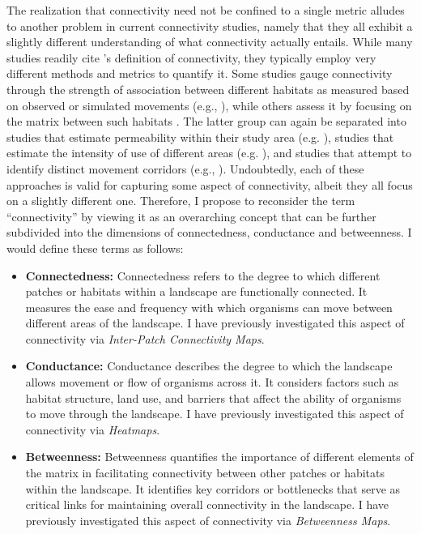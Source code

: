 \documentclass[../FinalThesis.tex]{subfiles}
\begin{document}
The realization that connectivity need not be confined to a single metric
alludes to another problem in current connectivity studies, namely that they all
exhibit a slightly different understanding of what connectivity actually
entails. While many studies readily cite \citet{Taylor.1993}'s definition of
connectivity, they typically employ very different methods and metrics to
quantify it. Some studies gauge connectivity through the strength of association
between different habitats as measured based on observed or simulated movements
(e.g., \citealp{Revilla.2008, Kanagaraj.2013, Dilts.2016}), while others assess
it by focusing on the matrix between such habitats \citep{Etherington.2016,
Diniz.2019}. The latter group can again be separated into studies that estimate
permeability within their study area (e.g. \citealp{Martin.2018}), studies that
estimate the intensity of use of different areas (e.g. \citealp{Zeller.2020}),
and studies that attempt to identify distinct movement corridors (e.g.,
\citealp{Elliot.2014, Benz.2016, Brennan.2020}). Undoubtedly, each of these
approaches is valid for capturing some aspect of connectivity, albeit they all
focus on a slightly different one. Therefore, I propose to reconsider the term
``connectivity'' by viewing it as an overarching concept that can be further
subdivided into the dimensions of connectedness, conductance and betweenness. I
would define these terms as follows:

\begin{itemize}

  \item \textbf{Connectedness:} Connectedness refers to the degree to which
  different patches or habitats within a landscape are functionally connected.
  It measures the ease and frequency with which organisms can move between
  different areas of the landscape. I have previously investigated this aspect
  of connectivity via \textit{Inter-Patch Connectivity Maps}.

  \item \textbf{Conductance:} Conductance describes the degree to which the
  landscape allows movement or flow of organisms across it. It considers factors
  such as habitat structure, land use, and barriers that affect the ability of
  organisms to move through the landscape. I have previously investigated this
  aspect of connectivity via \textit{Heatmaps}.

  \item \textbf{Betweenness:} Betweenness quantifies the importance of different
  elements of the matrix in facilitating connectivity between other patches or
  habitats within the landscape. It identifies key corridors or bottlenecks that
  serve as critical links for maintaining overall connectivity in the landscape.
  I have previously investigated this aspect of connectivity via
  \textit{Betweenness Maps}.

\end{itemize}
\end{document}
